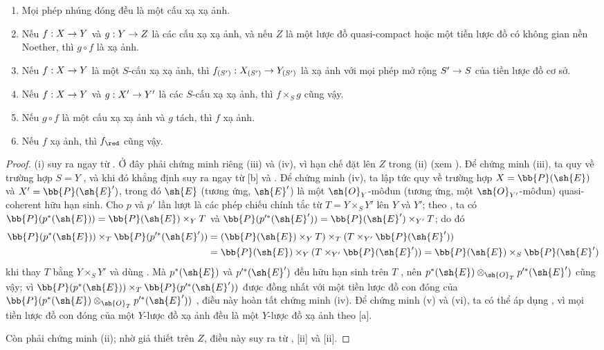 \documentclass[oneside,10pt]{amsart}
\makeatletter
\newcommand{\ega@arrow}[2]{\mathchoice{#1}{#2}{#2}{#2}}
\renewcommand{\to}{\ega@arrow{\longrightarrow}{\rightarrow}}
\let\EGAOriginalLabel\label
\renewcommand{\label}[1]{\phantomsection\EGAOriginalLabel{#1}}
\makeatother
\begin{document}
\begin{proposition}[5.5.5]
\label{II.5.5.5}
\medskip\noindent
\begin{enumerate}
  \item[{\rm(i)}] Mọi phép nhúng đóng đều là một cấu xạ xạ ảnh.
  \item[{\rm(ii)}] Nếu $f:X\to Y$ và $g:Y\to Z$ là các cấu xạ xạ ảnh, và nếu $Z$ là một lược đồ quasi-compact hoặc một tiền lược đồ có không gian nền Noether, thì $g\circ f$ là xạ ảnh.
  \item[{\rm(iii)}] Nếu $f:X\to Y$ là một $S$-cấu xạ xạ ảnh, thì $f_{(S')}:X_{(S')}\to Y_{(S')}$ là xạ ảnh với mọi phép mở rộng $S'\to S$ của tiền lược đồ cơ sở.
  \item[{\rm(iv)}] Nếu $f:X\to Y$ và $g:X'\to Y'$ là các $S$-cấu xạ xạ ảnh, thì $f\times_S g$ cũng vậy.
  \item[{\rm(v)}] Nếu $g\circ f$ là một cấu xạ xạ ảnh và $g$ tách, thì $f$ xạ ảnh.
  \item[{\rm(vi)}] Nếu $f$ xạ ảnh, thì $f_\red$ cũng vậy.
\end{enumerate}
\end{proposition}

\begin{proof}
(i) suy ra ngay từ .
Ở đây phải chứng minh riêng (iii) và (iv), vì hạn chế đặt lên $Z$ trong (ii) (xem ).
Để chứng minh (iii), ta quy về trường hợp $S=Y$ , và khi đó khẳng định suy ra ngay từ [b] và .
Để chứng minh (iv), ta lập tức quy về trường hợp $X=\bb{P}(\sh{E})$ và $X'=\bb{P}(\sh{E}')$, trong đó $\sh{E}$ (tương ứng, $\sh{E}'$) là một $\sh{O}_Y$-môđun (tương ứng, một $\sh{O}_{Y'}$-môđun) quasi-coherent hữu hạn sinh.
Cho $p$ và $p'$ lần lượt là các phép chiếu chính tắc từ $T=Y\times_S Y'$ lên $Y$ và $Y'$; theo , ta có $\bb{P}(p^*(\sh{E}))=\bb{P}(\sh{E})\times_Y T$ và $\bb{P}(p^{\prime *}(\sh{E}'))=\bb{P}(\sh{E}')\times_{Y'}T$; do đó
\begin{align*}
  \bb{P}(p^*(\sh{E}))\times_T\bb{P}(p^{\prime *}(\sh{E}'))&=(\bb{P}(\sh{E})\times_Y T)\times_T(T\times_{Y'}\bb{P}(\sh{E}'))\\
                                               &=\bb{P}(\sh{E})\times_Y(T\times_{Y'}\bb{P}(\sh{E}'))=\bb{P}(\sh{E})\times_S\bb{P}(\sh{E}')
\end{align*}
khi thay $T$ bằng $Y\times_S Y'$ và dùng .
Mà $p^*(\sh{E})$ và $p^{\prime *}(\sh{E}')$ đều hữu hạn sinh trên $T$ , nên $p^*(\sh{E})\otimes_{\sh{O}_T}p^{\prime *}(\sh{E}')$ cũng vậy;
vì $\bb{P}(p^*(\sh{E}))\times_T\bb{P}(p^{\prime *}(\sh{E}'))$ được đồng nhất với một tiền lược đồ con đóng của $\bb{P}(p^*(\sh{E})\otimes_{\sh{O}_T}p^{\prime *}(\sh{E}'))$ , điều này hoàn tất chứng minh (iv).
Để chứng minh (v) và (vi), ta có thể áp dụng , vì mọi tiền lược đồ con đóng của một $Y$-lược đồ xạ ảnh đều là một $Y$-lược đồ xạ ảnh theo [a].

Còn phải chứng minh (ii); nhờ giả thiết trên $Z$, điều này suy ra từ , [ii] và [ii].
\end{proof}
\end{document}
